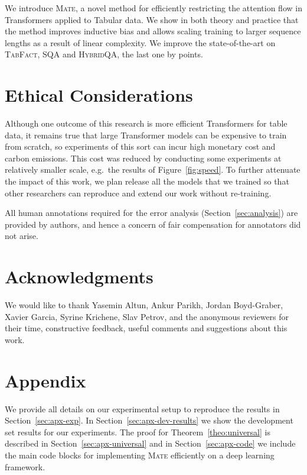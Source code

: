 \documentclass[11pt]{article}
\newcommand\sqa{\textsc{SQA}\xspace}
\newcommand\tabfact{\textsc{TabFact}\xspace}
\newcommand\hqa{\textsc{HybridQA}\xspace}
\newcommand{\model}{\textsc{Mate}\xspace}
\begin{document}
We introduce \model, a novel method for efficiently restricting the attention flow in Transformers applied to Tabular data.
We show in both theory and practice that the method improves inductive bias and
allows scaling training to larger sequence lengths as a result of linear complexity.
We improve the state-of-the-art on \tabfact, \sqa and \hqa, the last one by  points.

\section*{Ethical Considerations}

Although one outcome of this research is more efficient Transformers for table data, it remains true that large Transformer models can be expensive to train from scratch, so experiments of this sort can incur high monetary cost and carbon emissions. This cost was reduced by conducting some experiments at relatively smaller scale, e.g.~the results of Figure~\ref{fig:speed}.  To further attenuate the impact of this work, we plan release all the models that we trained so that other researchers can reproduce and extend our work without re-training.

All human annotations required for the error analysis (Section~\ref{sec:analysis}) are provided by authors, and hence a concern of fair compensation for annotators did not arise.

\section*{Acknowledgments}
We would like to thank Yasemin Altun, Ankur Parikh, Jordan Boyd-Graber, Xavier Garcia, Syrine Krichene, Slav Petrov, and
the anonymous reviewers for their time, constructive
feedback, useful comments and suggestions about this work.  




\clearpage

\appendix\section*{Appendix}

We provide all details on our experimental setup to reproduce the results in Section~\ref{sec:apx-exp}.
In Section~\ref{sec:apx-dev-results} we show the development set results for our experiments. 
The proof for Theorem~\ref{theo:universal} is described in Section~\ref{sec:apx-universal} and in Section~\ref{sec:apx-code} we include the main code blocks for implementing \model efficiently on a deep learning framework.
\end{document}

